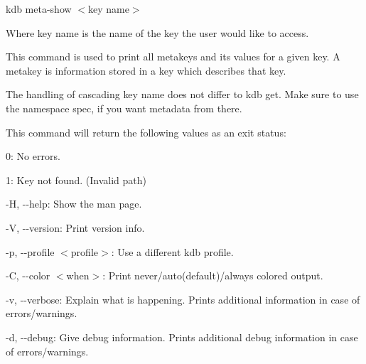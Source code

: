 {\ttfamily kdb meta-\/show $<$key name$>$}~\newline


Where {\ttfamily key name} is the name of the key the user would like to access.

This command is used to print all metakeys and its values for a given key. A metakey is information stored in a key which describes that key.

The handling of cascading {\ttfamily key name} does not differ to {\ttfamily kdb get}. Make sure to use the namespace {\ttfamily spec}, if you want metadata from there.

This command will return the following values as an exit status\+:~\newline



\begin{DoxyItemize}
\item 0\+: No errors.
\item 1\+: Key not found. (Invalid {\ttfamily path})
\end{DoxyItemize}


\begin{DoxyItemize}
\item {\ttfamily -\/H}, {\ttfamily -\/-\/help}\+: Show the man page.
\item {\ttfamily -\/V}, {\ttfamily -\/-\/version}\+: Print version info.
\item {\ttfamily -\/p}, {\ttfamily -\/-\/profile $<$profile$>$}\+: Use a different kdb profile.
\item {\ttfamily -\/C}, {\ttfamily -\/-\/color $<$when$>$}\+: Print never/auto(default)/always colored output.
\item {\ttfamily -\/v}, {\ttfamily -\/-\/verbose}\+: Explain what is happening. Prints additional information in case of errors/warnings.
\item {\ttfamily -\/d}, {\ttfamily -\/-\/debug}\+: Give debug information. Prints additional debug information in case of errors/warnings.
\end{DoxyItemize}


